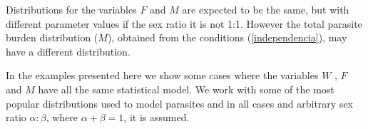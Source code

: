 \documentclass[12pt,a4paper]{article}
\theoremstyle{plain}%
\theoremstyle{definition}
\theoremstyle{remark}
\begin{document}
Distributions for the variables $F$ and $M$ are expected to be the same, but with different parameter values if the sex ratio it is not 1:1. However the total parasite burden distribution ($M$), obtained from the conditions (\ref{independencia}), may have a different distribution. 

	
	
	In the examples presented here we show some cases where the variables $W$ , $F$ and $M$ have all the same statistical model.
	We work with some of the most popular distributions	used to model parasites and in all cases and arbitrary sex ratio $\alpha:\beta$, where $\alpha+\beta=1$, it is assumed. 
	
\end{document}

